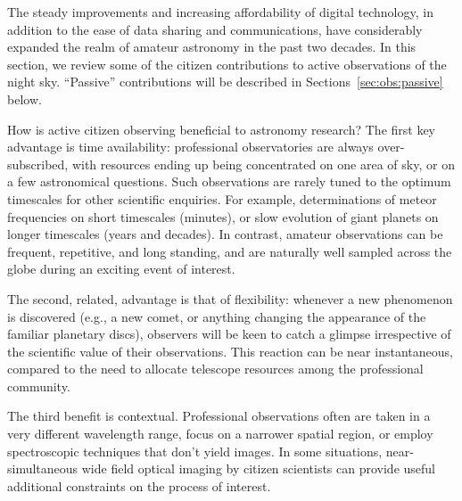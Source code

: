 \documentclass{ar2e}
\begin{document}
The steady improvements and increasing affordability of digital technology, in
addition to the ease of data sharing and communications, have considerably
expanded the realm of amateur astronomy in the past two decades.  
In this section, we review some of the citizen contributions to active
observations of the night sky.  ``Passive'' contributions 
will be described in Sections~\ref{sec:obs:passive} below.

How is active citizen observing beneficial to astronomy research?  The first
key advantage is time availability: professional observatories are always
over-subscribed, with resources ending up being concentrated on one area of
sky, or on a few astronomical questions.  Such observations are rarely tuned
to the optimum timescales for other scientific enquiries. For example,
determinations of meteor frequencies on short timescales (minutes), or slow
evolution of giant planets on longer timescales (years and decades).  In
contrast, amateur observations can be frequent, repetitive, and long standing,
and are naturally well sampled across the globe during an exciting event of
interest. 

The second, related, advantage is that of flexibility: whenever a new phenomenon
is discovered (e.g., a new comet, or anything changing the appearance of the
familiar planetary discs), observers will be keen to catch a glimpse
irrespective of the scientific value of their observations.  This reaction can
be near instantaneous, compared to the need to allocate telescope resources
among the professional community.  

The third benefit is contextual.  Professional observations often are taken in a
very different wavelength range, focus on a narrower spatial region, or employ
spectroscopic techniques that don't yield images. In some situations,
near-simultaneous wide field optical imaging by citizen scientists can provide
useful additional constraints on the process of interest.
\end{document}
